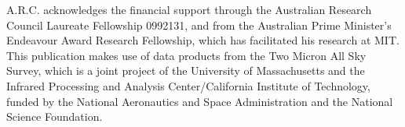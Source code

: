\documentclass{emulateapj}
\begin{document}
\acknowledgements
A.R.C. acknowledges the financial support through the Australian Research Council Laureate Fellowship 0992131, and from the Australian Prime Minister's Endeavour Award Research Fellowship, which has facilitated his research at MIT. This publication makes use of data products from the Two Micron All Sky Survey, which is a joint project of the University of Massachusetts and the Infrared Processing and Analysis Center/California Institute of Technology, funded by the National Aeronautics and Space Administration and the National Science Foundation.





\end{document}
